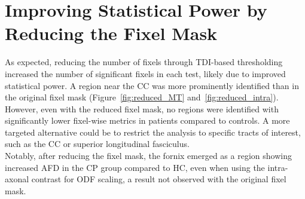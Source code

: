 \section{Improving Statistical Power by Reducing the Fixel Mask}
As expected, reducing the number of fixels through TDI-based thresholding increased the number of significant fixels in each test, likely due to improved statistical power. A region near the CC was more prominently identified than in the original fixel mask (Figure~\ref{fig:reduced_MT} and~\ref{fig:reduced_intra}). However, even with the reduced fixel mask, no regions were identified with significantly lower fixel-wise metrics in patients compared to controls.
A more targeted alternative could be to restrict the analysis to specific tracts of interest, such as the CC or superior longitudinal fasciculus. 
\\Notably, after reducing the fixel mask, the fornix emerged as a region showing increased AFD in the CP group compared to HC, even when using the intra-axonal contrast for ODF scaling, a result not observed with the original fixel mask.

